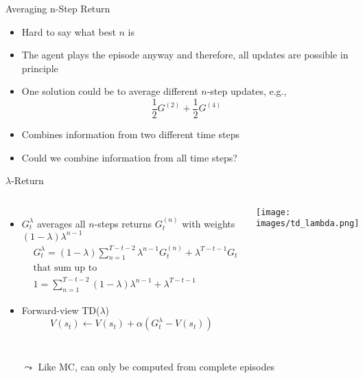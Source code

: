 \documentclass[aspectratio=169]{../latex_main/tntbeamer}  %
\begin{document}
\begin{frame}[c]{Averaging n-Step Return}
	
	\begin{itemize}
		\item Hard to say what best $n$ is
		\item The agent plays the episode anyway and therefore, all updates are possible in principle
		\item One solution could be to average different $n$-step updates, e.g.,
		$$ \frac{1}{2}G^{(2)} + \frac{1}{2}G^{(4)}$$
		\item Combines information from two different time steps
		\item Could we combine information from all time steps?
	\end{itemize}
	
\end{frame}
\begin{frame}[c]{$\lambda$-Return}
\vspace{-2em}	
\begin{columns}
	
	
	\begin{itemize}
		\item $G_t^{\lambda}$ averages all $n$-steps returns $G_t^{(n)}$		with weights $(1-\lambda) \lambda^{n-1}$
         \vspace{-0.1cm}
         \begin{align*}
             &G_t^\lambda = (1-\lambda) \sum_{n=1}^{T-t-2} \lambda^{n-1} G_t^{(n)} + \lambda^{T-t-1} G_t\\
            & \text{that sum up to}\\
             &1 = \sum_{n=1}^{T-t-2} (1-\lambda) \lambda^{n-1} + \lambda^{T-t-1}
         \end{align*}
		 \item Forward-view TD($\lambda$)
            \vspace{-0.1cm}
		  $$V(s_t) \gets V(s_t) + \alpha \left(G_t^\lambda - V(s_t)\right) $$
	\end{itemize}



\texttt{[image: images/td\_lambda.png]}
	
\end{columns}

\begin{itemize}
	\item[$\leadsto$] Like MC, can only be computed from complete episodes
\end{itemize}
	

	
\end{frame}
\end{document}
